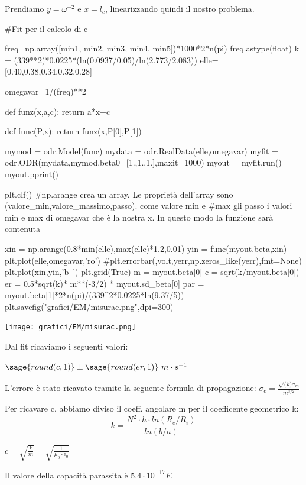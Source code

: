Prendiamo $y = \omega^{-2}$ e $x=l_c$, linearizzando quindi il nostro problema. 

\begin{sagesilent}

#Fit per il calcolo di c

freq=np.array([min1, min2, min3, min4, min5])*1000*2*n(pi)
freq.astype(float)
k = (339**2)*0.0225*(ln(0.0937/0.05)/ln(2.773/2.083))
elle=[0.40,0.38,0.34,0.32,0.28]

omegavar=1/(freq)**2 

def funz(x,a,c):
    return a*x+c

def func(P,x):
    return funz(x,P[0],P[1])

mymod = odr.Model(func)
mydata = odr.RealData(elle,omegavar)
myfit = odr.ODR(mydata,mymod,beta0=[1.,1.,1.],maxit=1000)
myout = myfit.run()
myout.pprint()

plt.clf()
#np.arange crea un array. Le proprietà dell'array sono (valore_min,valore_massimo,passo). come valore min e #max gli passo i valori min e max di omegavar che è la nostra x. In questo modo la funzione sarà contenuta 

xin = np.arange(0.8*min(elle),max(elle)*1.2,0.01)
yin = func(myout.beta,xin)
plt.plot(elle,omegavar,'ro')
#plt.errorbar(,volt,yerr,np.zeros_like(yerr),fmt=None)
plt.plot(xin,yin,'b--')
plt.grid(True)
m = myout.beta[0]
c = sqrt(k/myout.beta[0])
er = 0.5*sqrt(k)* m**(-3/2) * myout.sd_beta[0]  
par = myout.beta[1]*2*n(pi)/(339^2*0.0225*ln(9.37/5))
plt.savefig("grafici/EM/misurac.png",dpi=300)

\end{sagesilent}

\texttt{[image: grafici/EM/misurac.png]}


Dal fit ricaviamo i seguenti valori:

$\sage{round(c,1)} \pm \sage{round(er,1)}\ m \cdot s^{-1}$ 

L'errore è stato ricavato tramite la seguente formula di propagazione:
$\sigma_c = \frac{\sqrt(k)\sigma_m}{m^{3/2}}$

Per ricavare c, abbiamo diviso il coeff. angolare m per il coefficente geometrico k:
$$ k = \displaystyle \frac{N^2 \cdot h \cdot ln(R_e/R_i)}{ln(b/a)}$$

$c =\displaystyle \sqrt{\frac{k}{m}} = \sqrt{\frac{1}{\mu_0 \cdot \epsilon_0 }}$

Il valore della capacità parassita è $5.4\cdot 10^{-17} F$.
